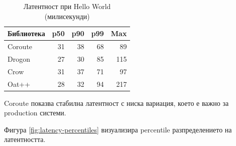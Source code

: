 \begin{table}[H]
\centering
\caption{Латентност при Hello World (милисекунди)}
\label{tab:latency}
\begin{tabular}{|l|r|r|r|r|}
\hline
\textbf{Библиотека} & \textbf{p50} & \textbf{p90} & \textbf{p99} & \textbf{Max} \\
\hline
Coroute & 31 & 38 & 68 & 89 \\
Drogon & 27 & 30 & 85 & 115 \\
Crow & 31 & 37 & 71 & 97 \\
Oat++ & 28 & 32 & 94 & 217 \\
\hline
\end{tabular}
\end{table}

Coroute показва стабилна латентност с ниска вариация, което е важно за production системи.

Фигура \ref{fig:latency-percentiles} визуализира percentile разпределението на латентността.

